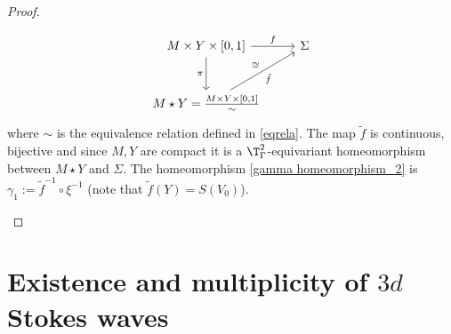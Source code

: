 \documentclass[11pt,a4paper,reqno]{article}
\numberwithin{equation}{section}
\theoremstyle{definition}
\begin{document}
\begin{proof}
\begin{itemize}
\[
\begin{tikzcd}[row sep=large]
 M \times Y \times [0,1] 
 \arrow[d,"\pi"']  \arrow[r,"f"]
 & 
\Sigma 
 \\
M \star Y = \frac{M \times Y\times[0,1]}\sim 
 \arrow[ur,"\tilde f "',"\cong"]
 & 
\end{tikzcd}
\]
where $ \sim $ is the equivalence relation defined in \eqref{eqrela}.
The map $ \tilde f $ is continuous, bijective and since $ M, Y $ are compact it is a $ \T^2_\Gamma $-equivariant homeomorphism between 
$ M \star Y $ and $ \Sigma $. The homeomorphism \eqref{gamma homeomorphism_2} is 
$ \gamma_1 := \tilde f^{-1} \circ \xi^{-1} $ (note that $ \tilde f (Y) = S(V_0) $).        
        \qedhere
        \end{itemize}
        \end{proof}
        
\section{Existence and multiplicity of $3d$ Stokes waves}
\label{sec:final}
\end{document}

